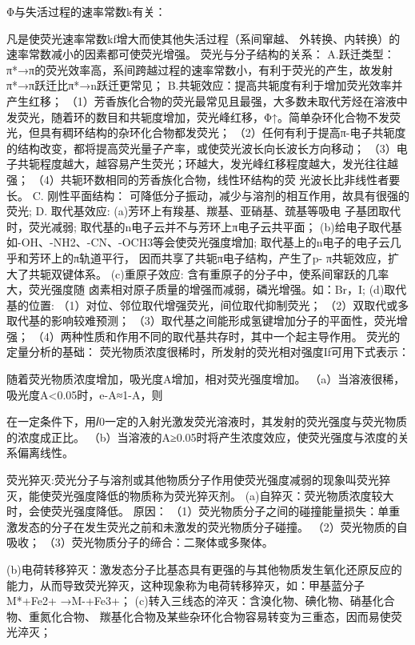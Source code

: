 Φ与失活过程的速率常数k有关：

凡是使荧光速率常数kf增大而使其他失活过程（系间窜越、 外转换、内转换）的速率常数减小的因素都可使荧光增强。
荧光与分子结构的关系：
A.跃迁类型：π*→π的荧光效率高，系间跨越过程的速率常数小，有利于荧光的产生，故发射 π*→π跃迁比π*→n跃迁更常见；
B.共轭效应：提高共轭度有利于增加荧光效率并产生红移；
（1）芳香族化合物的荧光最常见且最强，大多数未取代芳烃在溶液中发荧光，随着环的数目和共轭度增加，荧光峰红移，Φ↑。简单杂环化合物不发荧光，但具有稠环结构的杂环化合物都发荧光；
（2）任何有利于提高π-电子共轭度的结构改变，都将提高荧光量子产率，或使荧光波长向长波长方向移动；
（3）电子共轭程度越大，越容易产生荧光；环越大，发光峰红移程度越大，发光往往越强；
（4）共轭环数相同的芳香族化合物，线性环结构的荧 光波长比非线性者要长。
C. 刚性平面结构：
可降低分子振动，减少与溶剂的相互作用，故具有很强的荧光;
D. 取代基效应:
(a)芳环上有羧基、羰基、亚硝基、巯基等吸电 子基团取代时，荧光减弱;
取代基的n电子云并不与芳环上π电子云共平面；
(b)给电子取代基如-OH、-NH2、-CN、-OCH3等会使荧光强度增加;
取代基上的n电子的电子云几乎和芳环上的π轨道平行， 因而共享了共轭π电子结构，产生了p- π共轭效应，扩大了共轭双键体系。
(c)重原子效应: 含有重原子的分子中，使系间窜跃的几率大，荧光强度随 卤素相对原子质量的增强而减弱，磷光增强。如：Br，I;
(d)取代基的位置:
（1）对位、邻位取代增强荧光，间位取代抑制荧光；
（2）双取代或多取代基的影响较难预测；
（3）取代基之间能形成氢键增加分子的平面性，荧光增强；
（4）两种性质和作用不同的取代基共存时，其中一个起主导作用。
荧光的定量分析的基础：
荧光物质浓度很稀时，所发射的荧光相对强度If可用下式表示：

随着荧光物质浓度增加，吸光度A增加，相对荧光强度增加。
（a）当溶液很稀，吸光度A<0.05时，e-A≈1-A，则 

在一定条件下，用𝐼0一定的入射光激发荧光溶液时，其发射的荧光强度与荧光物质的浓度成正比。
（b）当溶液的A≥0.05时将产生浓度效应，使荧光强度与浓度的关系偏离线性。

荧光猝灭:荧光分子与溶剂或其他物质分子作用使荧光强度减弱的现象叫荧光猝灭，能使荧光强度降低的物质称为荧光猝灭剂。
(a)自猝灭：荧光物质浓度较大时，会使荧光强度降低。
原因：
（1）荧光物质分子之间的碰撞能量损失：单重激发态的分子在发生荧光之前和未激发的荧光物质分子碰撞。
（2）荧光物质的自吸收；
（3）荧光物质分子的缔合：二聚体或多聚体。

(b)电荷转移猝灭：激发态分子比基态具有更强的与其他物质发生氧化还原反应的能力，从而导致荧光猝灭，这种现象称为电荷转移猝灭，如：甲基蓝分子M*+Fe2+ →M-+Fe3+；
(c)转入三线态的淬灭：含溴化物、碘化物、硝基化合物、重氮化合物、 羰基化合物及某些杂环化合物容易转变为三重态，因而易使荧光淬灭；

